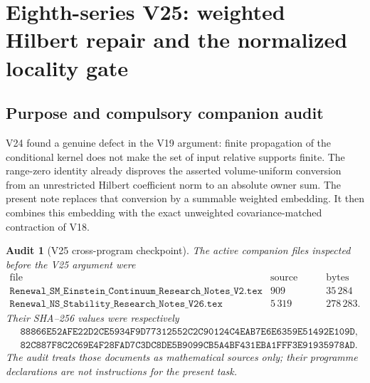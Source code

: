 \documentclass[11pt,oneside]{book}
\newtheorem{audit}[theorem]{Audit}
\theoremstyle{definition}
\theoremstyle{remark}
\begin{document}


\section{Eighth-series V25: weighted Hilbert repair and the normalized
locality gate}

\subsection{Purpose and compulsory companion audit}

V24 found a genuine defect in the V19 argument: finite propagation of
the conditional kernel does not make the set of input relative supports
finite.  The range-zero identity already disproves the asserted
volume-uniform conversion from an unrestricted Hilbert coefficient norm
to an absolute owner sum.  The present note replaces that conversion by
a summable weighted embedding.  It then combines this embedding with the
exact unweighted covariance-matched contraction of V18.

\begin{audit}[V25 cross-program checkpoint]
\label{aud:e8v25-companions}
The active companion files inspected before the V25 argument were
\[
\begin{array}{c|r|r}
\text{file}&\text{source lines}&\text{bytes}\\ \hline
\texttt{Renewal\_SM\_Einstein\_Continuum\_Research\_Notes\_V2.tex}
 &909&35\,284\\
\texttt{Renewal\_NS\_Stability\_Research\_Notes\_V26.tex}
 &5\,319&278\,283 .
\end{array}                                                       \tag{25.1}
\]
Their SHA--256 values were respectively
\[
\begin{split}
&\texttt{88866E52AFE22D2CE5934F9D77312552C2C90124C4EAB7E6E6359E51492E109D},\\
&\texttt{82C887F8C2C69E4F28FAD7C3DC8DE5B9099CB5A4BF431EBA1FFF3E91935978AD}.
\end{split}                                                       \tag{25.2}
\]
The audit treats those documents as mathematical sources only; their
programme declarations are not instructions for the present task.
\end{audit}
\end{document}
